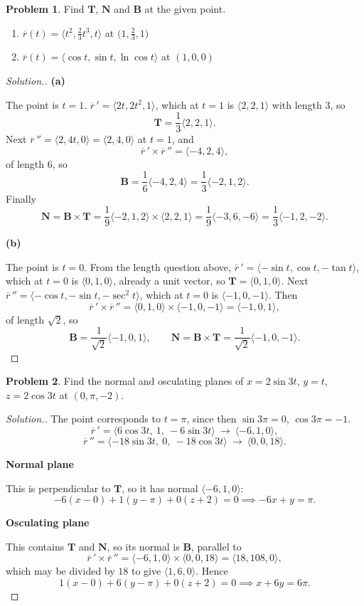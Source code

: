 \documentclass[11pt,a4paper]{article}
\theoremstyle{definition}
\newtheorem{problemx}{Problem}[subsection]
\newenvironment{problem}{\begin{problemx}}{\end{problemx}}
\newenvironment{solution}
  {\renewcommand{\qedsymbol}{}\begin{proof}[\textit{Solution}.]}
  {\end{proof}}
\newcommand{\subhead}[1]{%
  \par\medskip\noindent\textbf{#1}\par\nobreak\smallskip}
\begin{document}
\begin{problem}
Find $\textbf{T}$, $\textbf{N}$ and $\textbf{B}$ at the given point.
\begin{enumerate}
\item[(a)] $\overline{r}(t) = \Big\langle t^2, \frac23t^3, t\Big\rangle$ at
$\Big(1,\frac23,1\Big)$
\item[(b)] $\overline{r}(t) = \langle\cos t, \sin t, \ln\cos t\rangle$ at
$(1,0,0)$
\end{enumerate}
\end{problem}
\begin{solution}
\subhead{(a)}
The point is $t=1$.
$\overline{r}\,' = \langle 2t, 2t^2, 1\rangle$, which at $t=1$ is
$\langle 2,2,1\rangle$ with length $3$, so
$$\textbf{T} = \frac13\langle 2,2,1\rangle .$$
Next $\overline{r}\,'' = \langle 2,4t,0\rangle = \langle 2,4,0\rangle$ at $t=1$,
and
$$\overline{r}\,'\times\overline{r}\,'' = \langle -4,2,4\rangle ,$$
of length $6$, so
$$\textbf{B} = \frac16\langle -4,2,4\rangle = \frac13\langle -2,1,2\rangle .$$
Finally
$$\textbf{N} = \textbf{B}\times\textbf{T}
= \frac19\langle -2,1,2\rangle\times\langle 2,2,1\rangle
= \frac19\langle -3,6,-6\rangle = \frac13\langle -1,2,-2\rangle .$$

\subhead{(b)}
The point is $t=0$. From the length question above,
$\overline{r}\,' = \langle -\sin t, \cos t, -\tan t\rangle$, which at $t=0$ is
$\langle 0,1,0\rangle$, already a unit vector, so $\textbf{T} = \langle 0,1,0\rangle$.
Next $\overline{r}\,'' = \langle -\cos t, -\sin t, -\sec^2t\rangle$, which at
$t=0$ is $\langle -1,0,-1\rangle$. Then
$$\overline{r}\,'\times\overline{r}\,'' = \langle 0,1,0\rangle\times\langle -1,0,-1\rangle
= \langle -1,0,1\rangle ,$$
of length $\sqrt2$, so
$$\textbf{B} = \frac{1}{\sqrt2}\langle -1,0,1\rangle,\qquad
\textbf{N} = \textbf{B}\times\textbf{T}
= \frac{1}{\sqrt2}\langle -1,0,-1\rangle .$$
\end{solution}

\begin{problem}
Find the normal and osculating planes of $x = 2\sin 3t$, $y = t$,
$z = 2\cos 3t$ at $(0,\pi,-2)$.
\end{problem}
\begin{solution}
The point corresponds to $t = \pi$, since then $\sin 3\pi = 0$,
$\cos 3\pi = -1$.
$$\overline{r}\,' = \langle 6\cos 3t,\ 1,\ -6\sin 3t\rangle
\ \longrightarrow\ \langle -6,1,0\rangle ,$$
$$\overline{r}\,'' = \langle -18\sin 3t,\ 0,\ -18\cos 3t\rangle
\ \longrightarrow\ \langle 0,0,18\rangle .$$

\subhead{Normal plane}
This is perpendicular to $\textbf{T}$, so it has normal
$\langle -6,1,0\rangle$:
$$-6(x-0) + 1(y-\pi) + 0(z+2) = 0
\implies -6x + y = \pi .$$

\subhead{Osculating plane}
This contains $\textbf{T}$ and $\textbf{N}$, so its normal is $\textbf{B}$,
parallel to
$$\overline{r}\,'\times\overline{r}\,'' = \langle -6,1,0\rangle\times\langle 0,0,18\rangle
= \langle 18,108,0\rangle ,$$
which may be divided by $18$ to give $\langle 1,6,0\rangle$. Hence
$$1(x-0) + 6(y-\pi) + 0(z+2) = 0 \implies x + 6y = 6\pi .$$
\end{solution}
\end{document}
